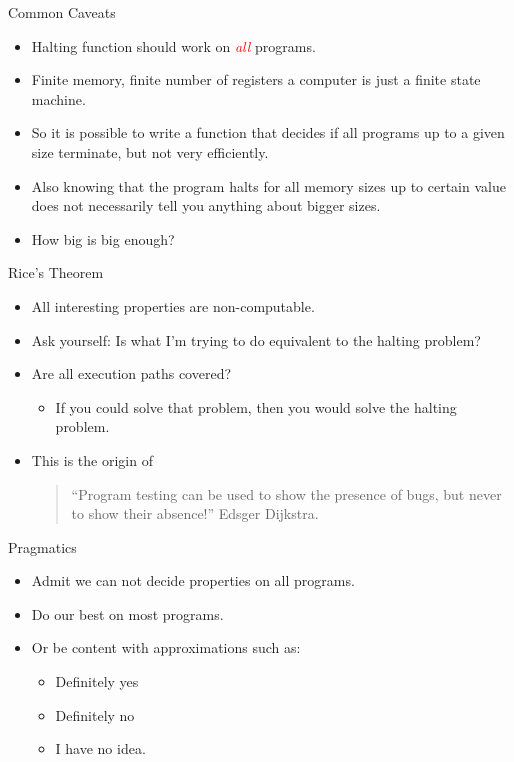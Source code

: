 \documentclass[handout]{beamer}
\begin{document}
\begin{frame}{Common Caveats}
  \begin{itemize}
  \item Halting function should work on \textcolor{red}{\em all} programs.
  \item Finite memory, finite number of registers a computer is just a
    finite state machine.
  \item So it is possible to write a function that decides if all
    programs up to a given size terminate, but not very efficiently.
  \item Also knowing that the program halts for all memory sizes up to
    certain value does not necessarily tell you anything about bigger
    sizes. 
\item How big is big enough? 
  \end{itemize}
\end{frame}
\begin{frame}{Rice's Theorem}
  \begin{itemize}
  \item All interesting properties are non-computable. 
  \item Ask yourself: Is what I'm trying to do equivalent to the
    halting problem?
    \item Are all execution paths covered?
      \begin{itemize}
      \item  If you could solve that problem, then you would solve the
        halting problem.
      \end{itemize}
    \item This is the origin of 
  \begin{quote}
    ``Program testing can be used to show the presence of bugs, but
    never to show their absence!'' Edsger Dijkstra.
  \end{quote}
  \end{itemize}
\end{frame}
\begin{frame}{Pragmatics}
  \begin{itemize}
  \item Admit we can not decide properties on all programs.
  \item Do our best on most programs.
  \item Or be content with approximations such as: 
    \begin{itemize}
    \item Definitely yes
    \item Definitely no
    \item I have no idea.
    \end{itemize}
  \end{itemize}
\end{frame}
\end{document}
